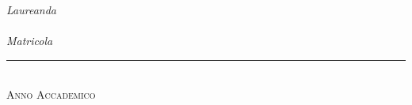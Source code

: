 \begin{titlepage}
\begin{center}
\begin{large}
            \begin{flushright}
                \textit{Laureanda}\\
                \vspace{5pt}
                \myName \\
                \vspace{5pt}
                \textit{Matricola} \myID
            \end{flushright}
        \end{large}

        \vfill

        \rule{\textwidth}{0.4pt}\\[5pt]
        \textsc{Anno Accademico \myAA}
    \end{center}
\end{titlepage}
